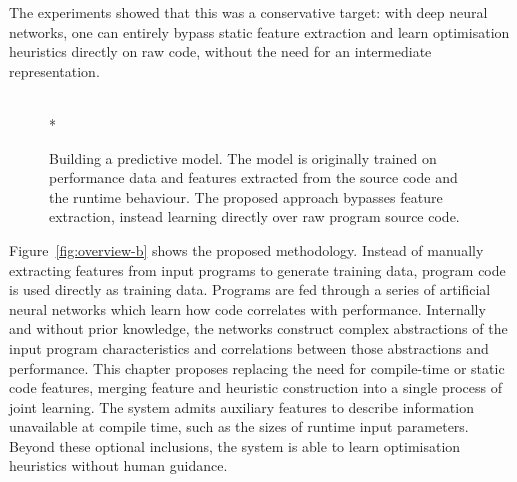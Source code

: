 The experiments showed that this was a conservative target: with deep neural networks, one can entirely bypass static feature extraction and learn optimisation heuristics directly on raw code, without the need for an intermediate representation.

\begin{figure}[t!]
	\centering
	\\*%
	\caption[Using machine learning for compiler optimisations]{%
		Building a predictive model. The model is originally trained on performance data and features extracted from the source code and the runtime behaviour. The proposed approach bypasses feature extraction, instead learning directly over raw program source code.%
	}%
	\label{fig:overview}
\end{figure}

Figure~\ref{fig:overview-b} shows the proposed methodology. Instead of manually extracting features from input programs to generate training data, program code is used directly as training data. Programs are fed through a series of artificial neural networks which learn how code correlates with performance. Internally and without prior knowledge, the networks construct complex abstractions of the input program characteristics and correlations between those abstractions and performance. This chapter proposes replacing the need for compile-time or static code features, merging feature and heuristic construction into a single process of joint learning. The system admits auxiliary features to describe information unavailable at compile time, such as the sizes of runtime input parameters. Beyond these optional inclusions, the system is able to learn optimisation heuristics without human guidance.

